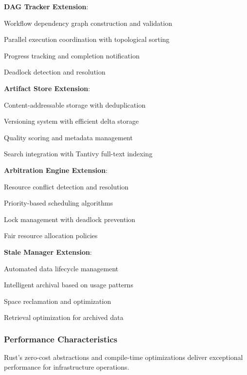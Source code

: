 \textbf{DAG Tracker Extension}:
\begin{compactlist}
    \item Workflow dependency graph construction and validation
    \item Parallel execution coordination with topological sorting
    \item Progress tracking and completion notification
    \item Deadlock detection and resolution
\end{compactlist}

\textbf{Artifact Store Extension}:
\begin{compactlist}
    \item Content-addressable storage with deduplication
    \item Versioning system with efficient delta storage
    \item Quality scoring and metadata management
    \item Search integration with Tantivy full-text indexing
\end{compactlist}

\textbf{Arbitration Engine Extension}:
\begin{compactlist}
    \item Resource conflict detection and resolution
    \item Priority-based scheduling algorithms
    \item Lock management with deadlock prevention
    \item Fair resource allocation policies
\end{compactlist}

\textbf{Stale Manager Extension}:
\begin{compactlist}
    \item Automated data lifecycle management
    \item Intelligent archival based on usage patterns
    \item Space reclamation and optimization
    \item Retrieval optimization for archived data
\end{compactlist}

\subsubsection*{Performance Characteristics}

Rust's zero-cost abstractions and compile-time optimizations deliver exceptional performance for infrastructure operations.

